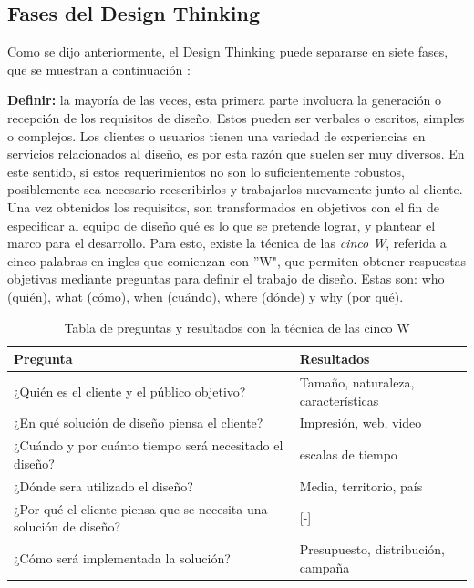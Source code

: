 \subsection{Fases del Design Thinking}

Como se dijo anteriormente, el Design Thinking puede separarse en siete fases, que se muestran a continuación \citep{ambrose2010}: 

\begin{description}
\item \textbf{Definir:} la mayoría de las veces, esta primera parte involucra la generación o recepción de los requisitos de diseño. Estos pueden ser verbales o escritos, simples o complejos. Los clientes o usuarios tienen una variedad de experiencias en servicios relacionados al diseño, es por esta razón que suelen ser muy diversos. En este sentido, si estos requerimientos no son lo suficientemente robustos, posiblemente sea necesario reescribirlos y trabajarlos nuevamente junto al cliente. Una vez obtenidos los requisitos, son transformados en objetivos con el fin de especificar al equipo de diseño qué es lo que se pretende lograr, y plantear el marco para el desarrollo. Para esto, existe la técnica de las \textit{cinco W}, referida a cinco palabras en ingles que comienzan con ''W", que permiten obtener respuestas objetivas mediante preguntas para definir el trabajo de diseño. Estas son: who (quién), what (cómo), when (cuándo), where (dónde) y why (por qué).

\begin{table}[H]
\centering
\begin{tabular}{|p{6cm}|p{5cm}|}
\hline
Pregunta & Resultados \\
\hline
¿Quién es el cliente y el público objetivo? & Tamaño, naturaleza, características \\
\hline
¿En qué solución de diseño piensa el cliente?& Impresión, web, video \\
\hline
¿Cuándo y por cuánto tiempo será necesitado el diseño? & escalas de tiempo \\
\hline
¿Dónde sera utilizado el diseño? & Media, territorio, país \\
\hline
¿Por qué el cliente piensa que se necesita una solución de diseño? & [-] \\
\hline
¿Cómo será implementada la solución? & Presupuesto, distribución, campaña\\
\hline

\end{tabular}
\caption{Tabla de preguntas y resultados con la técnica de las cinco W \citep{ambrose2010}}
\end{table}



\end{description}
